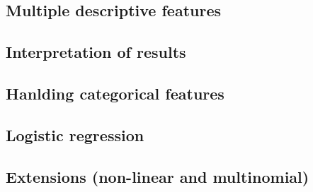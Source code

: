 
\subsection{Multiple descriptive features}
\subsection{Interpretation of results}
\subsection{Hanlding categorical features}
\subsection{Logistic regression}
\subsection{Extensions (non-linear and multinomial)}

